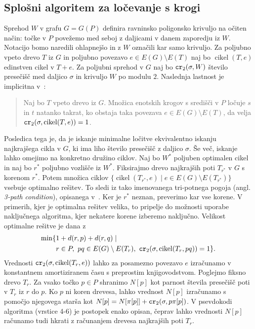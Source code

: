 \documentclass[a4paper, 12pt]{book}
\newcommand\CR{\mbox{\tt cr}_2}		  %
\begin{document}
\subsection{Splošni algoritem za ločevanje s krogi}
\label{generic-section}
Sprehod $W$ v grafu $G=G(P)$ definira ravninsko poligonsko krivuljo na očiten način: točke v $P$ povežemo med seboj z daljicami v danem zaporedju iz $W$. Notacijo bomo naredili ohlapnejšo in z $W$ označili kar samo krivuljo. Za poljubno vpeto drevo $T$ iz $G$ in poljubno povezavo $e\in E(G)\setminus E(T)$ naj bo $\operatorname{cikel}(T,e)$ edinstven cikel v $T + e$. Za poljubni sprehod v $G$ naj bo $\CR (\sigma,W)$  število presečišč med daljico $\sigma$ in krivuljo $W$ po modulu $2$. Naslednja lastnost je implicitna v~\cite{CG16}:
\begin{quote}
Naj bo $T$ vpeto drevo iz $G$. Množica enotskih krogov s središči v $P$ ločuje $s$ in $t$ natanko takrat, ko obstaja taka povezava $e\in E(G) \setminus E(T)$, da velja $\CR (\sigma, \operatorname{cikel}(T,e))=1$.
\end{quote}
Posledica tega je, da je iskanje minimalne ločitve ekvivalentno iskanju najkrajšega cikla v $G$, ki ima liho število presečišč z daljico $\sigma$. Še več, iskanje lahko omejimo na konkretno družino ciklov. Naj bo $W^*$ poljuben optimalen cikel in naj bo $r^*$ poljubno vozlišče iz $W^*$. Fiksirajmo drevo najkrajših poti $T_{r^*}$ v $G$ s korenom $r^*$. Potem množica ciklov $\{ \operatorname{cikel}(T_{r^*},e)\mid e\in E(G)\setminus E(T_{r^*})\}$ vsebuje optimalno rešitev. To sledi iz tako imenovanega tri-potnega pogoja (angl. \textit{3-path condition}), opisanega v~\cite{CG16}. Ker   je $r^*$ neznan, preverimo kar vse korene. V primerih, kjer je optimalna rešitev velika, to pripelje do možnosti uporabe naključnega algoritma, kjer nekatere korene izberemo naključno. Velikost optimalne rešitve je dana z
\begin{align*}
\min \{& 1+d(r,p)+d(r,q) \mid \\
	   & r\in P,~ pq\in E(G)\setminus E(T_r),~
		\CR(\sigma,\operatorname{cikel}(T_{r},pq))=1 \} .
\end{align*}
Vrednosti $\CR (\sigma, \operatorname{cikel}(T_r,e))$ lahko za posamezno povezavo $e$ izračunamo v konstantnem amortiziranem času s preprostim knjigovodstvom.  Poglejmo fiksno drevo $T_r$. Za vsako točko $p\in P$ shranimo $N[p]$ kot parnost števila presečišč poti v $T_r$ iz $r$ do $p$. Ko $p$ ni koren drevesa, lahko vrednost $N[p]$ izračunamo s pomočjo njegovega starša kot $N[p]=N[\pi[p]]+\CR(\sigma,p\pi[p])$. V psevdokodi algoritma (vrstice 4-6) je  postopek enako opisan, čeprav lahko vrednosti $N[p]$ računamo tudi hkrati z računanjem drevesa najkrajših poti $T_r$.
\end{document}
